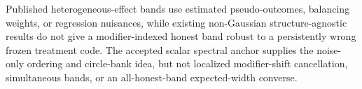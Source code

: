 Published heterogeneous-effect bands use estimated pseudo-outcomes, balancing weights, or regression nuisances, while existing non-Gaussian structure-agnostic results do not give a modifier-indexed honest band robust to a persistently wrong frozen treatment code. The accepted scalar spectral anchor supplies the noise-only ordering and circle-bank idea, but not localized modifier-shift cancellation, simultaneous bands, or an all-honest-band expected-width converse.